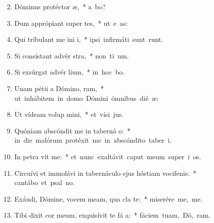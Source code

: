 \begin{flushleft}
\begin{enumerate}[leftmargin=*]
\setcounter{enumi}{1}

\item Dóminus protéctor  æ,~* \mbox{a  bo?}
\item Dum apprópiant super  tes,~* \mbox{ut e  as:}
\item Qui tríbulant me ini i,~* \mbox{ipsi infirmáti sunt  runt.}
\item Si consístant advér  stra,~* \mbox{non ti  um.}
\item Si exsúrgat advér  lium,~* \mbox{in hoc  bo.}
\item Unam pétii a Dómino,  ram,~* \mbox{ut inhábitem in domo Dómini ómnibus dié  æ:}
\item Ut vídeam volup mini,~* \mbox{et vísi  jus.}
\item Quóniam abscóndit me in taberná o:~* \mbox{in die malórum protéxit me in abscóndito taber i.}
\item In petra vit me:~* \mbox{et nunc exaltávit caput meum super i os.}
\item Circuívi et immolávi in tabernáculo ejus hóstiam vocifenis:~* \mbox{cantábo et psal  no.}
\item Exáudi, Dómine, vocem meam, qua cla  te:~* \mbox{miserére me,   me.}
\item Tibi dixit cor meum, exquisívit te fá a:~* \mbox{fáciem tuam, Dó, ram.}

\end{enumerate}
\end{flushleft}

